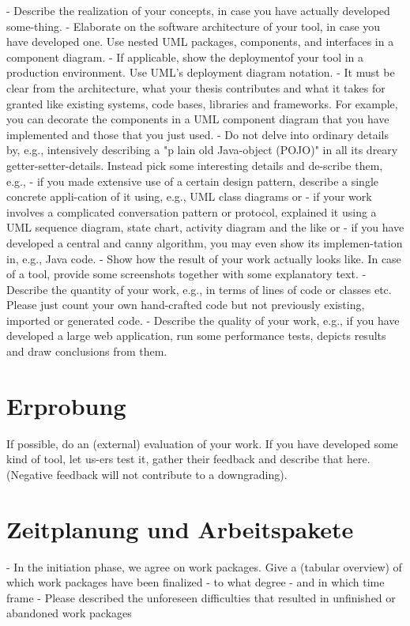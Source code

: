 - Describe the realization of your concepts, in case you have actually developed some-thing.
- Elaborate on the software architecture of your tool, in case you have developed one. Use nested UML packages, components, and interfaces in a component diagram.
- If applicable, show the deploymentof your tool in a production environment. Use UML's deployment diagram notation.
- It must be clear from the architecture, what your thesis contributes and what it takes for granted like existing systems, code bases, libraries and frameworks. For example, you can decorate the components in a UML component diagram that you have implemented and those that you just used.
- Do not delve into ordinary details by, e.g., intensively describing a "p lain old Java-object (POJO)" in all its dreary getter-setter-details. Instead pick some interesting details and de-scribe them, e.g.,
  - if   you made extensive use of a certain design pattern, describe a single concrete appli-cation of it using, e.g., UML class diagrams or
  - if your work involves a complicated conversation pattern or protocol, explained it using a UML sequence diagram, state chart, activity diagram and the like or
  - if you have developed a central and canny algorithm, you may even show its implemen-tation in, e.g., Java code.
- Show how the result of your work actually looks like. In case of a tool, provide some screenshots together with some explanatory text.
- Describe the quantity of your work, e.g., in terms of lines of code or classes etc. Please just count your own hand-crafted code but not previously existing, imported or generated code.
- Describe the quality of your work, e.g., if you have developed a large web application, run some performance tests, depicts results and draw conclusions from them.

\section{Erprobung}

If possible, do an (external) evaluation of your work. If you have developed some kind of tool, let us-ers test it, gather their feedback and describe that here. (Negative feedback will not contribute to a downgrading).

\section{Zeitplanung und Arbeitspakete}

- In the initiation phase, we agree on work packages. Give a (tabular overview) of which work packages have been finalized
  - to what degree
  - and in which time frame
- Please described the unforeseen difficulties that resulted in unfinished or abandoned work packages


